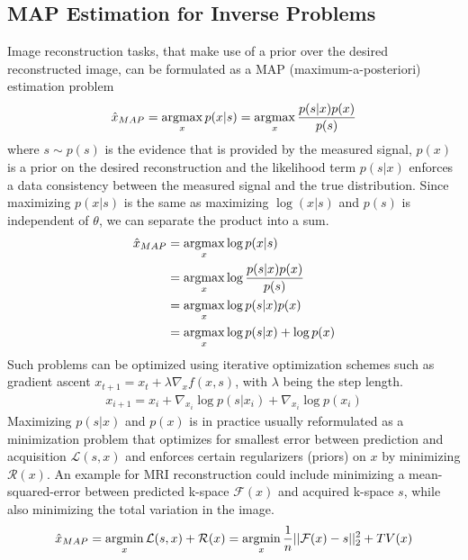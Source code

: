 \subsection{MAP Estimation for Inverse Problems}
Image reconstruction tasks, that make use of a prior over the desired reconstructed image, can be formulated as a MAP (maximum-a-posteriori) estimation problem
\begin{equation}
    \hat{x}_{MAP} = \operatorname*{argmax}_x p(x|s) = \operatorname*{argmax}_x \frac{p(s|x)p(x)}{p(s)}
\end{equation}
where $s \sim p(s)$ is the evidence that is provided by the measured signal, $p(x)$ is a prior on the desired reconstruction and the likelihood term $p(s|x)$ enforces a data consistency between the measured signal and the true distribution. Since maximizing $p(x|s)$ is the same as maximizing $\log(x|s)$ and $p(s)$ is independent of $\theta$, we can separate the product into a sum.
\begin{align}
    \hat{x}_{MAP} & = \operatorname*{argmax}_x \log p(x|s)             \\ & = \operatorname*{argmax}_x \log{\frac{p(s|x)p(x)}{p(s)}} \\
                  & = \operatorname*{argmax}_x \log p(s|x)p(x)         \\
                  & = \operatorname*{argmax}_x \log p(s|x) + \log p(x)
\end{align}
Such problems can be optimized using iterative optimization schemes such as gradient ascent $x_{t+1} = x_{t} + \lambda \nabla_{x} f(x, s)$, with $\lambda$ being the step length.
\begin{align}
    \label{eq:mapestimation}
    x_{i+1} = x_{i} + \nabla_{x_i} \log p(s|x_i) + \nabla_{x_i} \log p(x_i)
\end{align}
Maximizing $p(s|x)$ and $p(x)$ is in practice usually reformulated as a minimization problem that optimizes for smallest error between prediction and acquisition $\mathcal{L}(s, x)$ and enforces certain regularizers (priors) on $x$ by minimizing $\mathcal{R}(x)$. An example for MRI reconstruction could include minimizing a mean-squared-error between predicted k-space $\mathcal{F}(x)$ and acquired k-space $s$, while also minimizing the total variation in the image.~\autocite{RUDIN1992259}
\begin{equation}
    \hat{x}_{MAP} = \operatorname*{argmin}_x \mathcal{L}(s, x) + \mathcal{R}(x) = \operatorname*{argmin}_x \frac{1}{n}||\mathcal{F}(x) - s||_2^2 + TV(x)
\end{equation}

